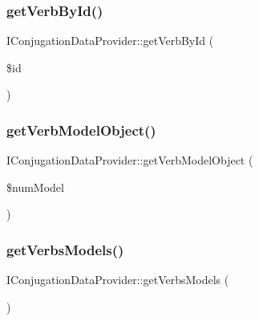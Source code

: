 \hypertarget{interface_i_conjugation_data_provider_a60a3d72a92a67f89a93b8396ea5edd0d}{}\label{interface_i_conjugation_data_provider_a60a3d72a92a67f89a93b8396ea5edd0d} 
\subsubsection{\texorpdfstring{get\+Verb\+By\+Id()}{getVerbById()}}
{\footnotesize\ttfamily I\+Conjugation\+Data\+Provider\+::get\+Verb\+By\+Id (\begin{DoxyParamCaption}\item[{}]{\$id }\end{DoxyParamCaption})}

\hypertarget{interface_i_conjugation_data_provider_abdf3d3ed8eb4045b80461a880c0a3e24}{}\label{interface_i_conjugation_data_provider_abdf3d3ed8eb4045b80461a880c0a3e24} 
\subsubsection{\texorpdfstring{get\+Verb\+Model\+Object()}{getVerbModelObject()}}
{\footnotesize\ttfamily I\+Conjugation\+Data\+Provider\+::get\+Verb\+Model\+Object (\begin{DoxyParamCaption}\item[{}]{\$num\+Model }\end{DoxyParamCaption})}

\hypertarget{interface_i_conjugation_data_provider_a1de2fd05896540e0e4e1f50631a2e86b}{}\label{interface_i_conjugation_data_provider_a1de2fd05896540e0e4e1f50631a2e86b} 
\subsubsection{\texorpdfstring{get\+Verbs\+Models()}{getVerbsModels()}}
{\footnotesize\ttfamily I\+Conjugation\+Data\+Provider\+::get\+Verbs\+Models (\begin{DoxyParamCaption}{ }\end{DoxyParamCaption})}

